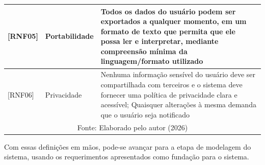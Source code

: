 \begin{longtable}{| p{} | p{} | p{} |}
        \hline

        [RNF05] &
        Portabilidade &

        Todos os dados do usuário podem ser exportados a qualquer momento, em
        um formato de texto que permita que ele possa ler e interpretar,
        mediante compreensão mínima da linguagem/formato utilizado \\

        \hline

        [RNF06] &
        Privacidade &

        Nenhuma informação sensível do usuário deve ser compartilhada com
        terceiros e o sistema deve fornecer uma política de privacidade clara e
        acessível; Quaisquer alterações à mesma demanda que o usuário seja
        notificado \\

        \hline
        \multicolumn{3}{c}{\small Fonte: Elaborado pelo autor (2026)} \\
\end{longtable}

Com essas definições em mãos, pode-se avançar para a etapa de modelagem do
sistema, usando os requerimentos apresentados como fundação para o sistema.
